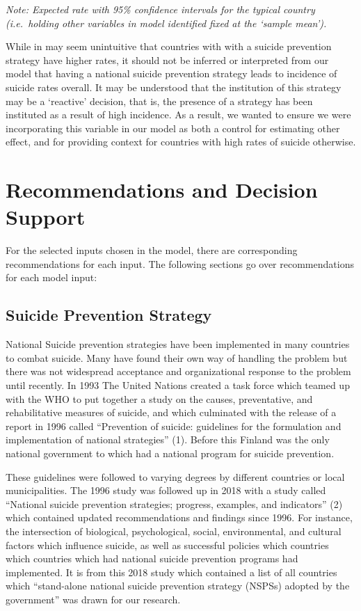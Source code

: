 \documentclass[]{article}
\begin{document}
\emph{Note: Expected rate with 95\% confidence intervals for the typical
country (i.e.~holding other variables in model identified fixed at the
`sample mean').}

While in may seem unintuitive that countries with with a suicide
prevention strategy have higher rates, it should not be inferred or
interpreted from our model that having a national suicide prevention
strategy leads to incidence of suicide rates overall. It may be
understood that the institution of this strategy may be a `reactive'
decision, that is, the presence of a strategy has been instituted as a
result of high incidence. As a result, we wanted to ensure we were
incorporating this variable in our model as both a control for
estimating other effect, and for providing context for countries with
high rates of suicide otherwise.

\section{Recommendations and Decision
Support}\label{recommendations-and-decision-support}

For the selected inputs chosen in the model, there are corresponding
recommendations for each input. The following sections go over
recommendations for each model input:

\subsection{Suicide Prevention
Strategy}\label{suicide-prevention-strategy}

National Suicide prevention strategies have been implemented in many
countries to combat suicide. Many have found their own way of handling
the problem but there was not widespread acceptance and organizational
response to the problem until recently. In 1993 The United Nations
created a task force which teamed up with the WHO to put together a
study on the causes, preventative, and rehabilitative measures of
suicide, and which culminated with the release of a report in 1996
called ``Prevention of suicide: guidelines for the formulation and
implementation of national strategies'' (1). Before this Finland was the
only national government to which had a national program for suicide
prevention.

These guidelines were followed to varying degrees by different countries
or local municipalities. The 1996 study was followed up in 2018 with a
study called ``National suicide prevention strategies; progress,
examples, and indicators'' (2) which contained updated recommendations
and findings since 1996. For instance, the intersection of biological,
psychological, social, environmental, and cultural factors which
influence suicide, as well as successful policies which countries which
countries which had national suicide prevention programs had
implemented. It is from this 2018 study which contained a list of all
countries which ``stand-alone national suicide prevention strategy
(NSPSs) adopted by the government'' was drawn for our research.
\end{document}
